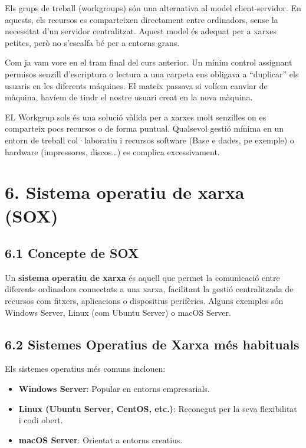 \documentclass[
  a4paper,
]{article}
\providecommand{\tightlist}{%
  \setlength{\itemsep}{0pt}\setlength{\parskip}{0pt}}
\begin{document}
Els grups de treball (workgroups) són una alternativa al model
client-servidor. En aquests, els recursos es comparteixen directament
entre ordinadors, sense la necessitat d'un servidor centralitzat. Aquest
model és adequat per a xarxes petites, però no s'escalfa bé per a
entorns grans.

Com ja vam vore en el tram final del curs anterior. Un mínim control
assignant permisos senzill d'escriptura o lectura a una carpeta ens
obligava a ``duplicar'' els usuaris en les diferents máquines. El mateix
passava si volíem canviar de màquina, havíem de tindr el nostre usuari
creat en la nova màquina.

EL Workgrup sols és una solució vàlida per a xarxes molt senzilles on es
comparteix pocs recursos o de forma puntual. Qualsevol gestió mínima en
un entorn de treball col·laboratiu i recursos software (Base e dades, pe
exemple) o hardware (impressores, discos\ldots) es complica
excessivament.

\section{6. Sistema operatiu de xarxa
(SOX)}\label{sistema-operatiu-de-xarxa-sox}

\subsection{6.1 Concepte de SOX}\label{concepte-de-sox}

Un \textbf{sistema operatiu de xarxa} és aquell que permet la
comunicació entre diferents ordinadors connectats a una xarxa,
facilitant la gestió centralitzada de recursos com fitxers, aplicacions
o dispositius perifèrics. Alguns exemples són Windows Server, Linux (com
Ubuntu Server) o macOS Server.

\subsection{6.2 Sistemes Operatius de Xarxa més
habituals}\label{sistemes-operatius-de-xarxa-muxe9s-habituals}

Els sistemes operatius més comuns inclouen:

\begin{itemize}
\tightlist
\item
  \textbf{Windows Server}: Popular en entorns empresarials.
\item
  \textbf{Linux (Ubuntu Server, CentOS, etc.)}: Reconegut per la seva
  flexibilitat i codi obert.
\item
  \textbf{macOS Server}: Orientat a entorns creatius.
\end{itemize}
\end{document}
